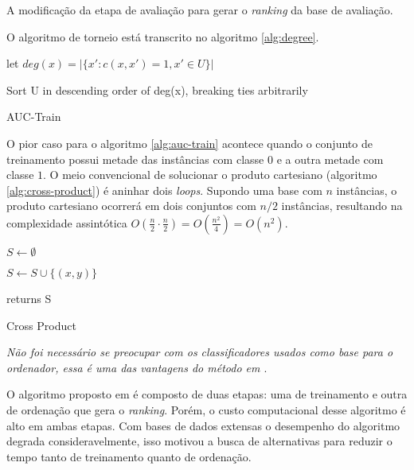 A modificação da etapa de avaliação para gerar o \emph{ranking} da base de avaliação.

O algoritmo de torneio está transcrito no algoritmo \ref{alg:degree}.

\begin{algorithm}
    \begin{algorithmic}

            \STATE let $deg(x) = |\{x':c(x, x') = 1, x' \in U\}|$
        \ENDFOR

        \STATE Sort U in descending order of deg(x), breaking ties arbitrarily

        \caption{AUC-Train}
        \label{alg:degree}

    \end{algorithmic}
\end{algorithm}

O pior caso para o algoritmo \ref{alg:auc-train} acontece quando o conjunto de treinamento possui metade das instâncias com classe $0$ e a outra metade com classe $1$. O meio convencional de solucionar o produto cartesiano (algoritmo \ref{alg:cross-product}) é aninhar dois \emph{loops}. Supondo uma base com $n$ instâncias, o produto cartesiano ocorrerá em dois conjuntos com $n/2$ instâncias, resultando na complexidade assintótica $O(\frac{n}{2} \cdot \frac{n}{2}) = O(\frac{n^2}{4}) = O(n^2)$.

\begin{algorithm}
    \begin{algorithmic}
        \STATE $S \gets \emptyset$

                \STATE $S \gets S \cup \{(x, y)\}$
            \ENDFOR
        \ENDFOR

        \STATE returns S

        \caption{Cross Product}
        \label{alg:cross-product}

    \end{algorithmic}
\end{algorithm}

\emph{Não foi necessário se preocupar com os classificadores usados como base para o ordenador, essa é uma das vantagens do método em \cite{langford08}}.

O algoritmo proposto em é composto de duas etapas: uma de treinamento e outra de ordenação que gera o \emph{ranking}. Porém, o custo computacional desse algoritmo é alto em ambas etapas. Com bases de dados extensas o desempenho do algoritmo degrada consideravelmente, isso motivou a busca de alternativas para reduzir o tempo tanto de treinamento quanto de ordenação.

